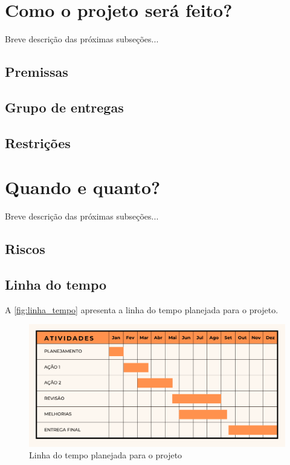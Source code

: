 \documentclass[12pt]{article}
\begin{document}
\section{Como o projeto será feito?} \label{sec:Como}
Breve descrição das próximas subseções...


\subsection{Premissas}

\subsection{Grupo de entregas}

\subsection{Restrições}


\section{Quando e quanto?} \label{sec:quandoquanto}
Breve descrição das próximas subseções...




\subsection{Riscos}

\subsection{Linha do tempo}


A \autoref{fig:linha_tempo} apresenta a linha do tempo planejada para o projeto.

\begin{figure}[H]
\caption{Linha do tempo planejada para o projeto}
\label{fig:linha_tempo}
\centering
\includegraphics[width=12cm]{images/cronograma_projeto.png}
\end{figure}
\end{document}
